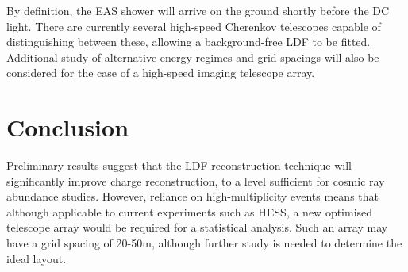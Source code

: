 \documentclass{article}
\begin{document}
By definition, the EAS shower will arrive on the ground shortly before the DC light. There are currently several high-speed Cherenkov telescopes capable of distinguishing between these, allowing a background-free LDF to be fitted. Additional study of alternative energy regimes and grid spacings will also be considered for the case of a high-speed imaging telescope array. 

\section{Conclusion}
Preliminary results suggest that the LDF reconstruction technique will significantly improve charge reconstruction, to a level sufficient for cosmic ray abundance studies. However, reliance on high-multiplicity events means that although applicable to current experiments such as HESS, a new optimised telescope array would be required for a statistical analysis. Such an array may have a grid spacing of 20-50m, although further study is needed to determine the ideal layout.


\end{document}
